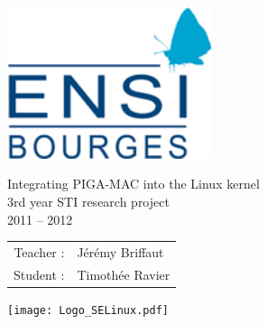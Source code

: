 \documentclass[pdftex,a4paper,titlepage,11pt]{article}
\newcommand\BackgroundPic[1]{
	\put(0,-100){
		\parbox[b][\paperheight]{\paperwidth}{
			\vfill
			\centering
			\texttt{[image: \#1]}
			\vfill
		}
	}
}
\begin{document}
\begin{titlepage}

\AddToShipoutPicture*{\BackgroundPic{Tux_n&b_half.png}}

\begin{center}
	\includegraphics[width=6cm, keepaspectratio=true]{Logo_ENSIB.png}
\end{center}

\vspace{0.5cm}

\begin{center}
	\fontsize{30}{30}\selectfont Integrating PIGA-MAC into the Linux kernel\\
	\vspace{2cm}
	\Huge 3rd year STI research project\\
	\Huge 2011 -- 2012
\end{center}

\vspace{2cm}

\begin{center}
	\begin{tabular}{rl}
		\hspace{7.5cm}
		\huge Teacher : & \huge Jérémy Briffaut\\[4pt]
		\huge Student : & \huge Timothée Ravier
	\end{tabular}
\end{center}

\vspace{0.5cm}

\begin{center}
\hspace{7.5cm}\texttt{[image: Logo\_SELinux.pdf]}
\end{center}

\end{titlepage}

\newpage

~\thispagestyle{fancy}

\newpage

~

\vspace{1cm}
\addtocounter{page}{-1}
\end{document}
